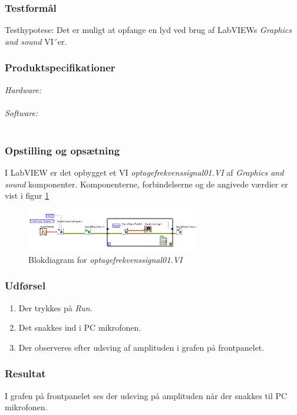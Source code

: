 \subsubsection{Testformål}
Testhypotese: Det er muligt at opfange en lyd ved brug af LabVIEWs \textit{Graphics and sound} VI´er. 
\subsubsection{Produktspecifikationer}

		\textit{Hardware:}\\
		\PC\\
	
		\textit{Software:}\\
		\labview\\

\subsubsection{Opstilling og opsætning}

I LabVIEW er det opbygget et VI \textit{optagefrekvenssignal01.VI} af \textit{Graphics and sound} komponenter. Komponenterne, forbindelserne og de angivede værdier er vist i figur \ref{fig:of01}

\begin{figure}[htb]
			\centering
				\includegraphics[width=3in]{of01}
				\caption{Blokdiagram for \textit{optagefrekvenssignal01.VI}}	
				\label{fig:of01}
			\end{figure}

\subsubsection{Udførsel}
\begin{enumerate} 
				\item Der trykkes på \textit{Run}. 
				\item Det snakkes ind i PC mikrofonen.
				\item Der observeres efter udsving af amplituden i grafen på frontpanelet.  
			\end{enumerate}

\subsubsection{Resultat}
I grafen på frontpanelet ses der udsving på amplituden når der snakkes til PC mikrofonen. 
